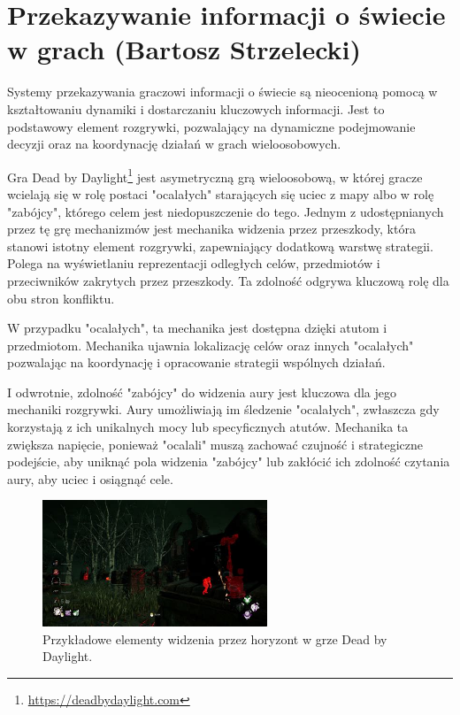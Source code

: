 \section{Przekazywanie informacji o świecie w grach (Bartosz Strzelecki)}\label{chap:dbd}
Systemy przekazywania graczowi informacji o świecie są nieocenioną pomocą w kształtowaniu dynamiki i dostarczaniu kluczowych informacji.
Jest to podstawowy element rozgrywki, pozwalający na dynamiczne podejmowanie decyzji oraz na koordynację działań w grach wieloosobowych.

Gra Dead by Daylight\footnote{\url{https://deadbydaylight.com}} jest asymetryczną grą wieloosobową, w której gracze wcielają się w rolę postaci "ocalałych" starających się uciec
z mapy albo w rolę "zabójcy", którego celem jest niedopuszczenie do tego. Jednym z udostępnianych przez tę grę mechanizmów jest mechanika widzenia przez przeszkody, która stanowi istotny element rozgrywki, zapewniający
dodatkową warstwę strategii. Polega na wyświetlaniu reprezentacji odległych celów, przedmiotów i przeciwników
zakrytych przez przeszkody. Ta zdolność odgrywa kluczową rolę dla obu stron konfliktu.

W przypadku "ocalałych", ta mechanika jest dostępna dzięki atutom i przedmiotom. Mechanika ujawnia lokalizację celów oraz
innych "ocalałych" pozwalając na koordynację i opracowanie strategii wspólnych działań.

I odwrotnie, zdolność "zabójcy" do widzenia aury jest kluczowa dla jego mechaniki rozgrywki.
Aury umożliwiają im śledzenie "ocalałych", zwłaszcza gdy korzystają z ich unikalnych mocy lub specyficznych atutów.
Mechanika ta zwiększa napięcie, ponieważ "ocalali" muszą zachować czujność i strategiczne podejście,
aby uniknąć pola widzenia "zabójcy" lub zakłócić ich zdolność czytania aury, aby uciec i osiągnąć cele.

\begin{figure}[h]
\centering
\includegraphics[width=0.6\textwidth]{images/aura}
\caption{Przykładowe elementy widzenia przez horyzont w grze Dead by Daylight.}
\end{figure}

